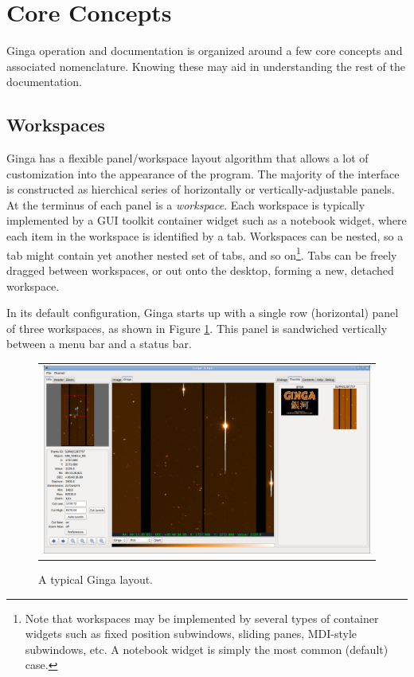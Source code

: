 \documentclass[11pt]{report}
\begin{document}
\section{Core Concepts}
Ginga operation and documentation is organized around a few core
concepts and associated nomenclature.  Knowing these may aid in
understanding the rest of the documentation. 

\subsection{Workspaces}
Ginga has a flexible panel/workspace layout algorithm that allows a
lot of customization into the appearance of the program.  The majority
of the interface is constructed as hierchical series of horizontally or
vertically-adjustable panels.  At the terminus of each panel is a
\emph{workspace}.
Each workspace is typically
implemented by a GUI toolkit container widget such as a notebook widget,
where each item in the workspace is identified by a tab.  Workspaces can
be nested, so a tab might contain yet another nested set of tabs, and so
on\footnote{Note that workspaces may be implemented by several types of 
  container widgets such as fixed position subwindows, sliding panes,
  MDI-style subwindows, etc.  A notebook widget is simply the most
  common (default) case.}. 
Tabs can be freely dragged between workspaces, or out onto the desktop,
forming a new, detached workspace.

In its default configuration, Ginga starts up with a
single row (horizontal) panel of three workspaces, as shown in
Figure \ref{fig:gingadefault}.
This panel is sandwiched vertically between a menu bar and a status bar.

\begin{figure}
  \begin{center}
    \begin{tabular}{c}
      \includegraphics[width=6in]{gingadefault.png}
    \end{tabular}
  \end{center}
  \caption[example] 
          { \label{fig:gingadefault} 
            A typical Ginga layout.} 
\end{figure} 
\end{document}
